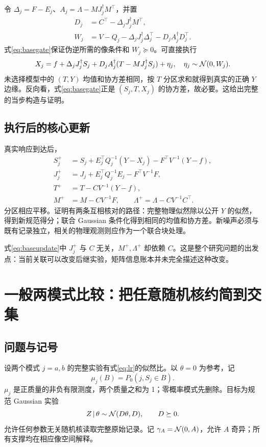 \documentclass[UTF8,fontset=fandol,11pt,a4paper]{ctexart}
\theoremstyle{definition}\newtheorem{definition}[theorem]{定义}\newtheorem{assumption}[theorem]{条件}
\numberwithin{equation}{section}
\begin{document}
令 $\Delta_j=F-E_j$、$A_j=\Lambda-MJ_j^\dagger M^\top$，并置
\begin{align}
D_j&=C^\top-\Delta_jJ_j^\dagger M^\top,\\
W_j&=V-Q_j-\Delta_jJ_j^\dagger\Delta_j^\top-D_jA_j^\dagger D_j^\top.
\end{align}
式\eqref{eq:basegate}保证伪逆所需的像条件和 $W_j\succeq0$。可直接执行
\begin{equation}
X_j=f+\Delta_jJ_j^\dagger S_j+
D_jA_j^\dagger(T-MJ_j^\dagger S_j)+\eta_j,
\quad\eta_j\sim\mathcal N(0,W_j).
\label{eq:basecontrol}
\end{equation}
未选择模型中的 $(T,Y)$ 均值和协方差相同，按 $T$ 分区求和就得到真实的正确 $Y$ 边缘。反向看，式\eqref{eq:basegate}正是 $(S_j,T,X_j)$ 的协方差，故必要。这给出完整的当步构造与证明。

\subsection{执行后的核心更新}
真实响应到达后，
\begin{align}
S_j^+&=S_j+E_j^\top Q_j^{-1}(Y-X_j)-F^\top V^{-1}(Y-f),\\
J_j^+&=J_j+E_j^\top Q_j^{-1}E_j-F^\top V^{-1}F,\\
T^+&=T-CV^{-1}(Y-f),\\
M^+&=M-CV^{-1}F,\qquad
\Lambda^+=\Lambda-CV^{-1}C^\top.
\label{eq:baseupdate}
\end{align}
分区相应平移。证明有两条互相核对的路径：完整物理似然除以公开 $Y$ 的似然，得到新规范得分；联合 Gaussian 条件化得到相同的均值和协方差。新噪声必须与既有记录独立，相关的物理观测则应作为一个联合块处理。

式\eqref{eq:baseupdate}中 $J_j^+$ 与 $C$ 无关，$M^+,\Lambda^+$ 却依赖 $C$。这是整个研究问题的出发点：当前关联可以改变后继实验，矩阵信息账本并未完全描述这种改变。

\section{一般两模式比较：把任意随机核约简到交集}
\label{sec:general}
\subsection{问题与记号}
设两个模式 $j=a,b$ 的完整实验有式\eqref{eq:lr}的似然比。以 $\theta=0$ 为参考，记
\[
\mu_j(B)=P_0(j,S_j\in B).
\]
$\mu_j$ 是正质量的非负有限测度，两个质量之和为 1；零概率模式先删除。目标为规范 Gaussian 实验
\begin{equation}
Z\,|\,\theta\sim\mathcal N(D\theta,D),\qquad D\succeq0.
\label{eq:target}
\end{equation}
允许任何参数无关随机核读取完整原始记录。记 $\gamma_A=\mathcal N(0,A)$，允许 $A$ 奇异；所有支撑均在相应像空间解释。
\end{document}

